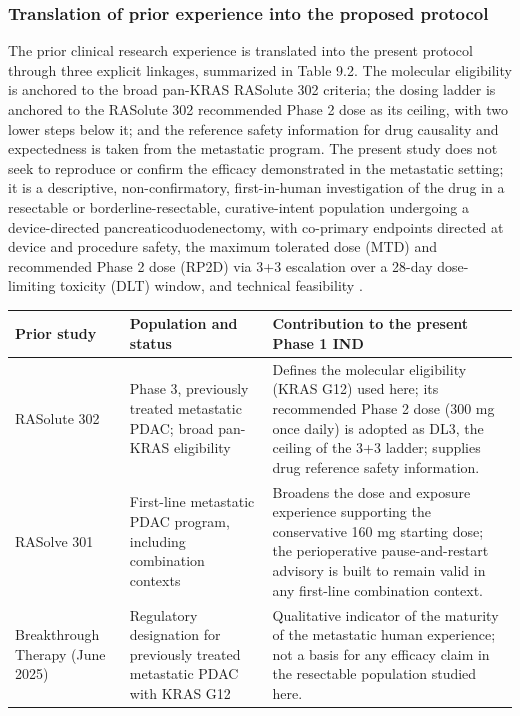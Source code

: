 \subsubsection*{Translation of prior experience into the proposed protocol}

The prior clinical research experience is translated into the present protocol
through three explicit linkages, summarized in Table 9.2. The molecular
eligibility is anchored to the broad pan-KRAS RASolute 302 criteria; the dosing
ladder is anchored to the RASolute 302 recommended Phase 2 dose as its ceiling,
with two lower steps below it; and the reference safety information for drug
causality and expectedness is taken from the metastatic program. The present study
does not seek to reproduce or confirm the efficacy demonstrated in the metastatic
setting; it is a descriptive, non-confirmatory, first-in-human investigation of the
drug in a resectable or borderline-resectable, curative-intent population
undergoing a device-directed pancreaticoduodenectomy, with co-primary endpoints
directed at device and procedure safety, the maximum tolerated dose (MTD) and
recommended Phase 2 dose (RP2D) via 3+3 escalation over a 28-day dose-limiting
toxicity (DLT) window, and technical feasibility \cite{phase1guidance, daraxwhipple}.

\vspace{0.2em}
\noindent\begin{tabularx}{\textwidth}{L{3.6cm} L{4.6cm} Y}
\toprule
\textbf{Prior study} & \textbf{Population and status} & \textbf{Contribution to the present Phase 1 IND} \\
\midrule
RASolute 302 & Phase 3, previously treated metastatic PDAC; broad pan-KRAS eligibility & Defines the molecular eligibility (KRAS G12) used here; its recommended Phase 2 dose (300 mg once daily) is adopted as DL3, the ceiling of the 3+3 ladder; supplies drug reference safety information. \\
RASolve 301 & First-line metastatic PDAC program, including combination contexts & Broadens the dose and exposure experience supporting the conservative 160 mg starting dose; the perioperative pause-and-restart advisory is built to remain valid in any first-line combination context. \\
Breakthrough Therapy (June 2025) & Regulatory designation for previously treated metastatic PDAC with KRAS G12 & Qualitative indicator of the maturity of the metastatic human experience; not a basis for any efficacy claim in the resectable population studied here. \\
\bottomrule
\end{tabularx}
\vspace{-0.2cm}

